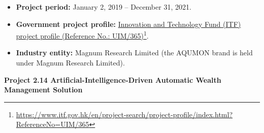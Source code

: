 \documentclass[11pt]{article}
\newcommand{\CVSubsection}[1]{\textbf{#1}\par}
\newenvironment{tightitemize}{%
  \begin{itemize}[leftmargin=*,nosep,topsep=2pt]
}{\end{itemize}}
\begin{document}
\begin{tightitemize}
  \item \textbf{Project period:} January 2, 2019 -- December 31, 2021.
  \item \textbf{Government project profile:} \href{https://www.itf.gov.hk/en/project-search/project-profile/index.html?ReferenceNo=UIM/365}{Innovation and Technology Fund (ITF) project profile (Reference No.: UIM/365)}\footnote{\url{https://www.itf.gov.hk/en/project-search/project-profile/index.html?ReferenceNo=UIM/365}}.
  \item \textbf{Industry entity:} Magnum Research Limited (the AQUMON brand is held under Magnum Research Limited).
\end{tightitemize}

\CVSubsection{Project 2.14 Artificial-Intelligence-Driven Automatic Wealth Management Solution}
\end{document}
